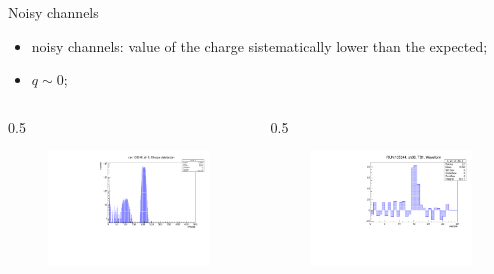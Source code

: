 \documentclass{beamer}[10pt]
\begin{document}
\begin{frame}{Noisy channels}
\begin{itemize}
\item noisy channels: value of the charge sistematically lower than the expected;
\item $q \sim 0$;
\end{itemize}
 \begin{columns}
  \begin{column}{0.5 \framewidth}
  \begin{figure}[H]
     \centering
     \includegraphics[width= .90\columnwidth]{figures/pdf/glitches.pdf}
     \label{fig:wffytl}
   \end{figure}
  \end{column}
  \begin{column}{0.5\framewidth}
  \begin{figure}[H]
     \centering
     \includegraphics[width= .90\columnwidth]{figures/pdf/noisy.pdf}
     \label{fig:wffytl}
   \end{figure}
  \end{column}
  \end{columns}
\end{frame}
\end{document}
